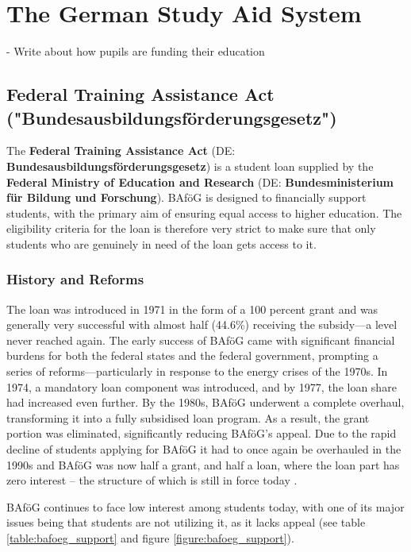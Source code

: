 \section{The German Study Aid System} 
\label{section:the-german-study-aid-system}


- Write about how pupils are funding their education 



\subsection{Federal Training Assistance Act ("Bundesausbildungsförderungsgesetz") } 
\label{subsection:federal-training-assistance-act}
The \textbf{Federal Training Assistance Act} (DE: \textbf{Bundesausbildungsförderungsgesetz}) is a student loan supplied by the \textbf{Federal Ministry of Education and Research} (DE: \textbf{Bundesministerium für Bildung und Forschung}). 
BAföG is designed to financially support students, with the primary aim of ensuring equal access to higher education. The eligibility criteria for the loan is therefore very strict to make sure that only students who are genuinely in need of the loan gets access to it.

\subsubsection{History and Reforms} 
\label{subsection:reforms}
The loan was introduced in 1971 in the form of a 100 percent grant and was generally very successful with almost half (44.6\%) receiving the subsidy---a level never reached again. 
The early success of BAföG came with significant financial burdens for both the federal states and the federal government, prompting a series of reforms—particularly in response to the energy crises of the 1970s. In 1974, a mandatory loan component was introduced, and by 1977, the loan share had increased even further. By the 1980s, BAföG underwent a complete overhaul, transforming it into a fully subsidised loan program. As a result, the grant portion was eliminated, significantly reducing BAföG's appeal.
Due to the rapid decline of students applying for BAföG it had to once again be overhauled in the 1990s and BAföG was now half a grant, and half a loan, where the loan part has zero interest -- the structure of which is still in force today \citep{lost_geschichte_2025}.

BAföG continues to face low interest among students today, with one of its major issues being that students are not utilizing it, as it lacks appeal (see table \ref{table:bafoeg_support} and figure \ref{figure:bafoeg_support}). 

